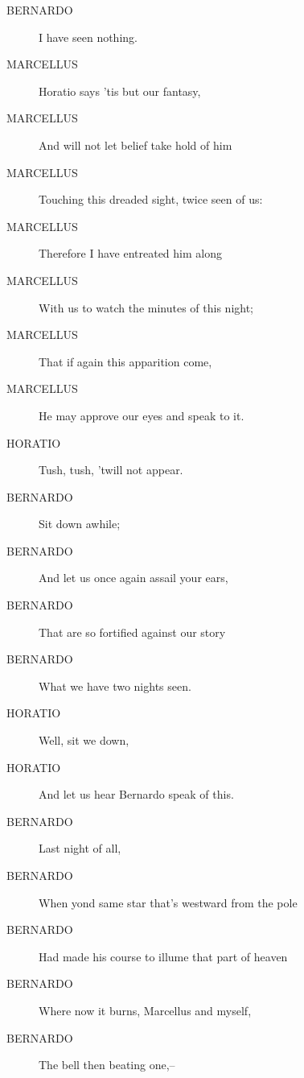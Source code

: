 \documentclass{article}
\begin{document}
\begin{description}
            
\item[BERNARDO] I have seen nothing.
\end{description}
          
\begin{description}
            
\item[MARCELLUS] Horatio says 'tis but our fantasy,
\item[MARCELLUS] And will not let belief take hold of him
\item[MARCELLUS] Touching this dreaded sight, twice seen of us:
\item[MARCELLUS] Therefore I have entreated him along
\item[MARCELLUS] With us to watch the minutes of this night;
\item[MARCELLUS] That if again this apparition come,
\item[MARCELLUS] He may approve our eyes and speak to it.
\end{description}
          
\begin{description}
            
\item[HORATIO] Tush, tush, 'twill not appear.
\end{description}
          
\begin{description}
            
\item[BERNARDO] Sit down awhile;
\item[BERNARDO] And let us once again assail your ears,
\item[BERNARDO] That are so fortified against our story
\item[BERNARDO] What we have two nights seen.
\end{description}
          
\begin{description}
            
\item[HORATIO] Well, sit we down,
\item[HORATIO] And let us hear Bernardo speak of this.
\end{description}
          
\begin{description}
            
\item[BERNARDO] Last night of all,
\item[BERNARDO] When yond same star that's westward from the pole
\item[BERNARDO] Had made his course to illume that part of heaven
\item[BERNARDO] Where now it burns, Marcellus and myself,
\item[BERNARDO] The bell then beating one,--
\end{description}
          
\end{document}
